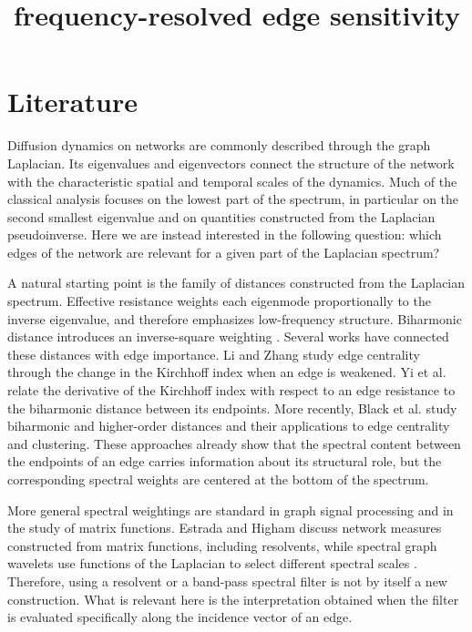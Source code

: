 \documentclass[11pt,reqno]{amsart}
\begin{document}
\title{frequency-resolved edge sensitivity}
\maketitle

\section{Literature}

Diffusion dynamics on networks are commonly described through the graph Laplacian. Its eigenvalues and eigenvectors connect the structure of the network with the characteristic spatial and temporal scales of the dynamics. Much of the classical analysis focuses on the lowest part of the spectrum, in particular on the second smallest eigenvalue and on quantities constructed from the Laplacian pseudoinverse. Here we are instead interested in the following question: which edges of the network are relevant for a given part of the Laplacian spectrum?

A natural starting point is the family of distances constructed from the Laplacian spectrum. Effective resistance weights each eigenmode proportionally to the inverse eigenvalue, and therefore emphasizes low-frequency structure. Biharmonic distance introduces an inverse-square weighting \cite{lipman2010biharmonic}. Several works have connected these distances with edge importance. Li and Zhang \cite{li2018kirchhoff} study edge centrality through the change in the Kirchhoff index when an edge is weakened. Yi et al. \cite{yi2018biharmonic} relate the derivative of the Kirchhoff index with respect to an edge resistance to the biharmonic distance between its endpoints. More recently, Black et al. \cite{black2024biharmonic} study biharmonic and higher-order distances and their applications to edge centrality and clustering. These approaches already show that the spectral content between the endpoints of an edge carries information about its structural role, but the corresponding spectral weights are centered at the bottom of the spectrum.

More general spectral weightings are standard in graph signal processing and in the study of matrix functions. Estrada and Higham \cite{estrada2010matrix} discuss network measures constructed from matrix functions, including resolvents, while spectral graph wavelets use functions of the Laplacian to select different spectral scales \cite{hammond2011wavelets}. Therefore, using a resolvent or a band-pass spectral filter is not by itself a new construction. What is relevant here is the interpretation obtained when the filter is evaluated specifically along the incidence vector of an edge.
\end{document}
